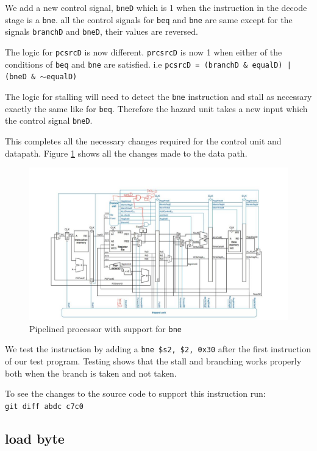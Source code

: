 \documentclass[titlepage,12pt,oneside,a4paper]{article}
\newcommand{\code}[1]{{\texttt{#1}}}
\begin{document}
We add a new control signal, \code{bneD} which is 1 when the instruction in the decode stage is a \code{bne}. all the control signals for \code{beq} and \code{bne} are same except for the signals \code{branchD} and \code{bneD}, their values are reversed. 

The logic for \code{pcsrcD} is now different. \code{prcsrcD} is now 1 when either of the conditions of \code{beq} and \code{bne} are satisfied. i.e \code{pcsrcD = (branchD \& equalD) | (bneD \& $\sim$equalD)}


The logic for stalling will need to detect the \code{bne} instruction and stall as necessary exactly the same like for \code{beq}. Therefore the hazard unit takes a new input which the control signal \code{bneD}.

This completes all the necessary changes required for the control unit and datapath. Figure \ref{fig:bne} shows all the changes made to the data path.

\begin{figure}
	\includegraphics[width=\textwidth]{bne.jpeg}
	\centering
	\caption{Pipelined processor with support for \code{bne}}
	\label{fig:bne}
\end{figure}

We test the instruction by adding a \code{bne \$s2, \$2, 0x30} after the first instruction of our test program. Testing shows that the stall and branching works properly both when the branch is taken and not taken.

To see the changes to the source code to support this instruction run:\\
\code{git diff abdc c7c0}

\subsection{load byte}
\end{document}
